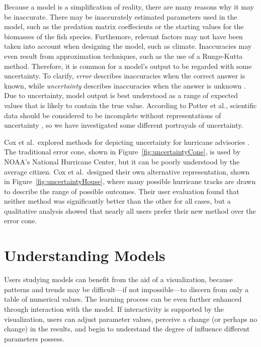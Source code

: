 Because a model is a simplification of reality, there are many reasons why it may be inaccurate.  There may be inaccurately estimated parameters used in the model, such as the predation matrix coeffecients or the starting values for the biomasses of the fish species.  Furthemore, relevant factors may not have been taken into account when designing the model, such as climate.  Inaccuracies may even result from approximation techniques, such as the use of a Runge-Kutta method.  Therefore, it is common for a model's output to be regarded with some uncertainty.  To clarify, \textit{error} describes inaccuracies when the correct answer is known, while \textit{uncertainty} describes inaccuracies when the answer is unknown \cite{hunter1993}.  Due to uncertainty, model output is best understood as a range of expected values that is likely to contain the true value.  According to Potter et al., scientific data should be considered to be incomplete without representations of uncertainty \cite{potter2010}, so we have investigated some different portrayals of uncertainty.

Cox et al.\ explored methods for depicting uncertainty for hurricane advisories \citeyearpar{cox2013}.  The traditional error cone, shown in Figure~\ref{fig:uncertaintyCone}, is used by NOAA's National Hurricane Center, but it can be poorly understood by the average citizen.  Cox et al.\ designed their own alternative representation, shown in Figure~\ref{fig:uncertaintyHouse}, where many possible hurricane tracks are drawn to describe the range of possible outcomes.  Their user evaluation found that neither method was significantly better than the other for all cases, but a qualitative analysis showed that nearly all users prefer their new method over the error cone.

\section{Understanding Models}

Users studying models can benefit from the aid of a visualization, because patterns and trends may be difficult---if not impossible---to discern from only a table of numerical values.  The learning process can be even further enhanced through interaction with the model.  If interactivity is supported by the visualization, users can adjust parameter values, perceive a change (or perhaps no change) in the results, and begin to understand the degree of influence different parameters possess.

